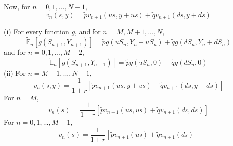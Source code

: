 \documentclass[12pt]{article}
\newenvironment{problem}[2][Problem]{\begin{trivlist}
		\item[\hskip \labelsep {\bfseries #1}\hskip \labelsep {\bfseries #2.}]}{\end{trivlist}}
\begin{document}
	Now, for $n=0,1,...,N-1$, 
	$$v_n(s,y) = \tilde{p}v_{n+1}(us,y+us)+\tilde{q}v_{n+1}(ds,y+ds)$$
	\begin{problem}{14}\end{problem}
	(i) For every function $g$, and for $n=M,M+1,...,N$, 
	$$\tilde{\mathbb{E}}_n[g(S_{n+1},Y_{n+1})] = \tilde{p}g(uS_n,Y_n+uS_n)+\tilde{q}g(dS_n,Y_n+dS_n)$$
	and for $n=0,1,...,M-2$, 
	$$\tilde{\mathbb{E}}_n[g(S_{n+1},Y_{n+1})] = \tilde{p}g(uS_n,0) + \tilde{q}g(dS_n,0)$$
	(ii) For $n=M+1,...,N-1$, 
	$$v_n(s,y) = \frac{1}{1+r}[\tilde{p}v_{n+1}(us,y+us)+\tilde{q}v_{n+1}(ds,y+ds)]$$
	For $n=M$,
	$$v_n(s) = \frac{1}{1+r}[\tilde{p}v_{n+1}(us,us)+\tilde{q}v_{n+1}(ds,ds)]$$
	For $n=0,1,...,M-1$,
	$$v_n(s) = \frac{1}{1+r}[\tilde{p}v_{n+1}(us)+\tilde{q}v_{n+1}(ds)]$$
 
\end{document}
